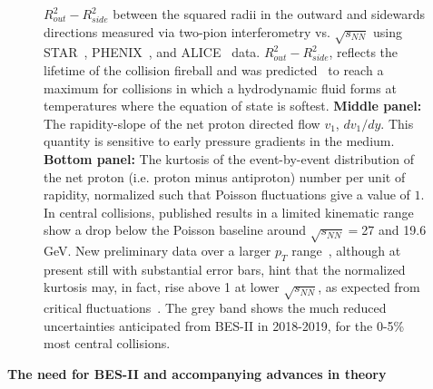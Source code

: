 \begin{figure}[!thp]
\begin{center}
{  $R_{out}^{2}-R_{side}^{2}$
  between the squared radii
  in the outward and sidewards directions
  measured via two-pion interferometry
  vs. $\sqrt{s_{NN}}$ using STAR~\cite{Adamczyk:2014mxp}, PHENIX~\cite{Adare:2014qvs}, and 
  ALICE~\cite{Aamodt:2011mr}
  data. $R_{out}^{2}-R_{side}^{2}$, 
  reflects the lifetime of the
  collision fireball and was predicted~\cite{Rischke:1996em} to reach
  a maximum for collisions in which a hydrodynamic fluid forms at
  temperatures where the equation of state is softest.  
  {\bf Middle panel:} The rapidity-slope of the net proton directed flow $v_1$,
  $dv_1/dy$. This quantity is sensitive to early pressure gradients in
  the medium.  
  {\bf Bottom panel:} The kurtosis of the event-by-event
  distribution of the net proton (i.e. proton minus antiproton) number
  per unit of rapidity, normalized such that Poisson fluctuations give
  a value of $1$. In central collisions, published results in a
  limited kinematic range~\cite{Adamczyk:2013dal} show a drop below
  the Poisson baseline around $\sqrt{s_{NN}}=$27 and 19.6 GeV. New
  preliminary data over a larger $p_T$ range~\cite{CPODKurtosis},
  although at present still with substantial error bars, hint that the
  normalized kurtosis may, in fact, rise above 1 at lower
  $\sqrt{s_{NN}}$, as expected from critical fluctuations~\cite{Stephanov:2011pb}. 
  The grey band shows the much reduced
  uncertainties anticipated from BES-II in 2018-2019, for the 0-5\%
  most central collisions.}
\label{F-PD2}
\vspace{-0.1in}
\end{center}
\end{figure}
%



{\bf The need for BES-II and accompanying advances in theory}


